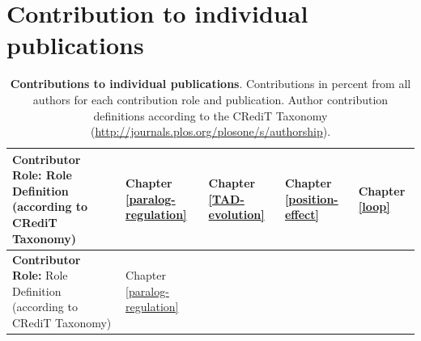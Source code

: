\documentclass[a4paper,twoside=true,openright,parskip=full,chapterprefix=true,11pt,headings=normal,bibliography=totoc,listof=totoc,titlepage=on,captions=tableabove,draft=false]{scrreprt}
\theoremstyle{definition}
\theoremstyle{definition}
\theoremstyle{definition}
\theoremstyle{remark}
\begin{document}
\hypertarget{contribution-to-individual-publications}{%
\chapter{Contribution to individual
publications}\label{contribution-to-individual-publications}}

\begin{longtable}[]{@{}lllll@{}}
\caption{\label{tab:contribution} \textbf{Contributions to individual
publications}. Contributions in percent from all authors for each
contribution role and publication. Author contribution definitions
according to the CRediT Taxonomy
(\url{http://journals.plos.org/plosone/s/authorship}).}\tabularnewline
\toprule
\begin{minipage}[b]{0.49\columnwidth}\raggedright
\textbf{Contributor Role:} Role Definition (according to CRediT
Taxonomy)\strut
\end{minipage} & \begin{minipage}[b]{0.11\columnwidth}\raggedright
Chapter \ref{paralog-regulation}\strut
\end{minipage} & \begin{minipage}[b]{0.09\columnwidth}\raggedright
Chapter \ref{TAD-evolution}\strut
\end{minipage} & \begin{minipage}[b]{0.10\columnwidth}\raggedright
Chapter \ref{position-effect}\strut
\end{minipage} & \begin{minipage}[b]{0.07\columnwidth}\raggedright
Chapter \ref{loop}\strut
\end{minipage}\tabularnewline
\midrule
\endfirsthead
\toprule
\begin{minipage}[b]{0.49\columnwidth}\raggedright
\textbf{Contributor Role:} Role Definition (according to CRediT
Taxonomy)\strut
\end{minipage} & \begin{minipage}[b]{0.11\columnwidth}\raggedright
Chapter \ref{paralog-regulation}\strut
\end{minipage} & \begin{minipage}[b]{0.09\columnwidth}\raggedright

\end{minipage}
\end{longtable}
\end{document}
